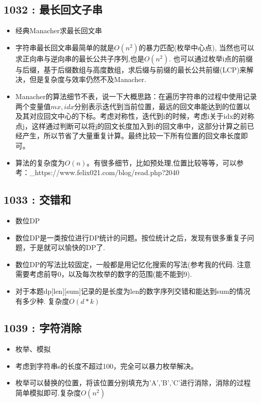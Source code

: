 \documentclass{article}
\begin{document}
\subsection{1032 : 最长回文子串}
\begin{itemize}
\item 经典Manacher求最长回文串
\item 字符串最长回文串最简单的就是$O(n^2)$的暴力匹配(枚举中心点), 当然也可以求正向串与逆向串的最长公共子序列,也是$O(n^2)$. 也可以通过枚举i点的前缀与后缀，基于后缀数组与高度数组，求后缀与前缀的最长公共前缀(LCP)来解决，但是复杂度与效率仍然不及Manacher.
\item Manacher的算法细节不表，说一下大概思路：在遍历字符串的过程中使用记录两个变量值$mx,idx$分别表示迭代到当前位置，最远的回文串能达到的位置以及其对应回文中心的下标。考虑对称性，迭代到i的时候，考虑i关于idx的对称点j，这样通过判断可以将j的回文长度加入到i的回文串中，这部分计算之前已经产生，所以节省了大量重复计算。最终比较一下所有位置的回文串长度即可。
\item 算法的复杂度为$O(n)$。有很多细节，比如预处理,位置比较等等，可以参考：\_{https://www.felix021.com/blog/read.php?2040}
\end{itemize}


\subsection{1033 : 交错和}
\begin{itemize}
\item 数位DP
\item 数位DP是一类按位进行DP统计的问题。按位统计之后，发现有很多重复子问题，于是就可以愉快的DP了.
\item 数位DP的写法比较固定，一般都是用记忆化搜索的写法(参考我的代码. 注意需要考虑前导0，以及每次枚举的数字的范围(能不能到9).
\item 对于本题dp[len][sum]记录的是长度为len的数字序列交错和能达到sum的情况有多少种. 复杂度$O(d*k)$
\end{itemize}


\subsection{1039 : 字符消除}
\begin{itemize}
\item 枚举、模拟
\item 考虑到字符串s的长度不超过100，完全可以暴力枚举解决。
\item 枚举可以替换的位置，将该位置分别填充为'A','B','C'进行消除，消除的过程简单模拟即可.复杂度$O(n^2)$
\end{itemize}

\end{document}
